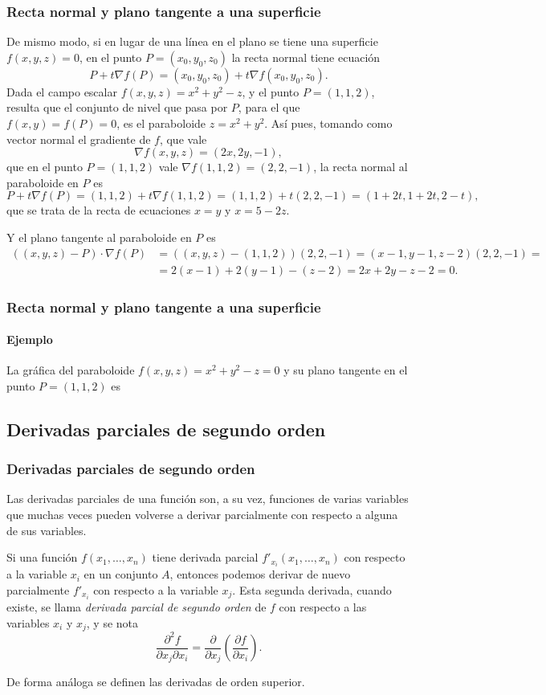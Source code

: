 \begin{frame}
\frametitle{Recta normal y plano tangente a una superficie}
De mismo modo, si en lugar de una línea en el plano se tiene una superficie $f(x,y,z)=0$, en el punto $P=(x_0,y_0,z_0)$ la recta normal tiene ecuación
\[
P+t\nabla f(P) = (x_0,y_0,z_0)+t\nabla f(x_0,y_0,z_0).
\]
Dada el campo escalar $f(x,y,z)=x^2+y^2-z$, y el punto $P=(1,1,2)$, resulta que el conjunto de nivel que pasa por $P$, para el que $f(x,y)=f(P)=0$, es el paraboloide $z=x^2+y^2$.
Así pues, tomando como vector normal el gradiente de $f$, que vale  
\[
\nabla f(x,y,z) = (2x,2y,-1),
\] 
que en el punto $P=(1,1,2)$ vale $\nabla f(1,1,2) = (2,2,-1)$, la recta normal al paraboloide en $P$ es
\[
P+t\nabla f(P) = (1,1,2)+t\nabla f(1,1,2) = (1,1,2)+t(2,2,-1) = (1+2t,1+2t,2-t),
\]
que se trata de la recta de ecuaciones  $x=y$ y $x=5-2z$.

Y el plano tangente al paraboloide en $P$ es
\begin{align*}
((x,y,z)-P)\cdot \nabla f(P) &= ((x,y,z)-(1,1,2))(2,2,-1) = (x-1,y-1,z-2)(2,2,-1)=\\
 &= 2(x-1)+2(y-1)-(z-2) = 2x+2y-z-2= 0.
\end{align*}
\end{frame}


\begin{frame}
\frametitle{Recta normal y plano tangente a una superficie}
\framesubtitle{Ejemplo}
La gráfica del paraboloide $f(x,y,z)=x^2+y^2-z=0$ y su plano tangente en el punto $P=(1,1,2)$ es 
\begin{center}
\scalebox{1}{}
\end{center}
\end{frame}


\subsection{Derivadas parciales de segundo orden}
\begin{frame}
\frametitle{Derivadas parciales de segundo orden}
Las derivadas parciales de una función son, a su vez, funciones de varias variables que muchas veces pueden volverse a
derivar parcialmente con respecto a alguna de sus variables. 

Si una función $f(x_1,\ldots,x_n)$ tiene derivada parcial $f'_{x_i}(x_1,\ldots,x_n)$ con respecto a la variable $x_i$ en un conjunto $A$, entonces podemos derivar de nuevo parcialmente $f'_{x_i}$ con respecto a la variable $x_j$. Esta segunda derivada, cuando existe, se llama \emph{derivada parcial de segundo orden} de $f$ con respecto a las variables $x_i$ y $x_j$, y se nota
\[
\frac{\partial ^2 f}{\partial x_j \partial x_i}= \frac{\partial}{\partial x_j}\left(\frac{\partial f}{\partial x_i}\right).
\]

De forma análoga se definen las derivadas de orden superior.
\end{frame}


